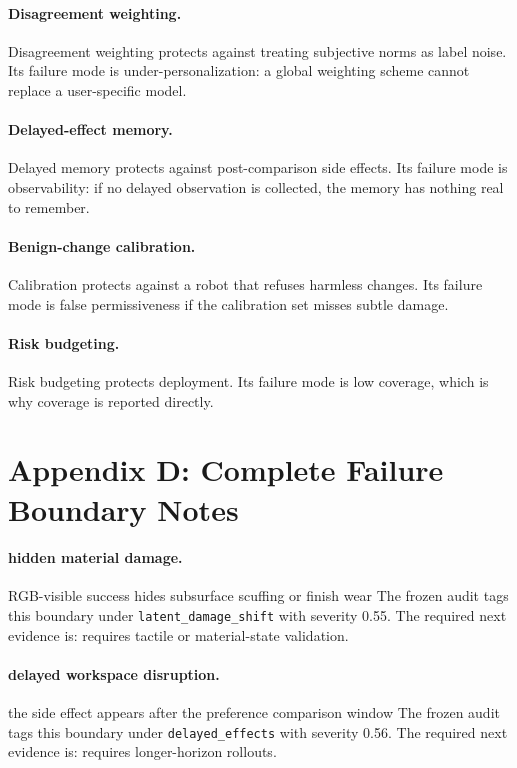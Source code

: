\documentclass{article}
\begin{document}
\paragraph{Disagreement weighting.} Disagreement weighting protects against treating subjective norms as label noise. Its failure mode is under-personalization: a global weighting scheme cannot replace a user-specific model.

\paragraph{Delayed-effect memory.} Delayed memory protects against post-comparison side effects. Its failure mode is observability: if no delayed observation is collected, the memory has nothing real to remember.

\paragraph{Benign-change calibration.} Calibration protects against a robot that refuses harmless changes. Its failure mode is false permissiveness if the calibration set misses subtle damage.

\paragraph{Risk budgeting.} Risk budgeting protects deployment. Its failure mode is low coverage, which is why coverage is reported directly.

\section*{Appendix D: Complete Failure Boundary Notes}
\paragraph{hidden material damage.} RGB-visible success hides subsurface scuffing or finish wear The frozen audit tags this boundary under \texttt{latent\_damage\_shift} with severity 0.55. The required next evidence is: requires tactile or material-state validation.

\paragraph{delayed workspace disruption.} the side effect appears after the preference comparison window The frozen audit tags this boundary under \texttt{delayed\_effects} with severity 0.56. The required next evidence is: requires longer-horizon rollouts.
\end{document}
